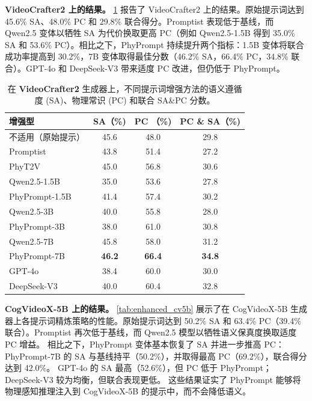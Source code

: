 \textbf{VideoCrafter2 上的结果。}
\cref{tab:enhanced_vc2} 报告了 VideoCrafter2 上的结果。原始提示词达到 45.6\% SA、48.0\% PC 和 29.8\% 联合得分。Promptist 表现低于基线，而 Qwen2.5 变体以牺牲 SA 为代价换取更高 PC（例如 Qwen2.5-1.5B 得到 35.0\% SA 和 53.6\% PC）。相比之下，PhyPrompt 持续提升两个指标：1.5B 变体将联合成功率提高到 30.2\%，7B 变体取得最佳分数（46.2\% SA，66.4\% PC，34.8\% 联合）。GPT-4o 和 DeepSeek-V3 带来适度 PC 改进，但仍低于 PhyPrompt。
\begin{table}[ht]
  \centering
  \caption{在 \textbf{VideoCrafter2} 生成器上，不同提示词增强方法的语义遵循度 (SA)、物理常识 (PC) 和联合 SA\&PC 分数。}
  \setlength{\tabcolsep}{3pt}
  \label{tab:enhanced_vc2}
  \begin{tabular}{lccc}
    \toprule
    \textbf{增强型} & \textbf{SA（\%)} & \textbf{PC （\%)} & \textbf{PC \& SA（\%)} \\
    \midrule
    不适用（原始提示） & 45.6 & 48.0 & 29.8 \\
    Promptist             & 43.8 & 51.4 & 27.2 \\
    PhyT2V                & 45.0 & 56.8 & 30.6 \\
    \midrule
    Qwen2.5-1.5B          & 35.0 & 53.6 & 27.8 \\
    PhyPrompt-1.5B        & 41.4 & 57.4 & 30.2 \\
    Qwen2.5-3B            & 40.0 & 55.8 & 28.0 \\
    PhyPrompt-3B          & 38.0 & 61.0 & 30.8 \\
    Qwen2.5-7B            & 45.8 & 58.0 & 31.2 \\
    PhyPrompt-7B          & \textbf{46.2} & \textbf{66.4} & \textbf{34.8} \\
    \midrule
    GPT-4o                & 38.4 & 60.0 & 30.0 \\
    DeepSeek-V3           & 40.0 & 60.4 & 32.8 \\
    \bottomrule
  \end{tabular}
\end{table}

\textbf{CogVideoX-5B 上的结果。}
\cref{tab:enhanced_cv5b} 展示了在 CogVideoX-5B 生成器上各提示词精炼策略的性能。原始提示词达到 50.2\% SA 和 63.4\% PC（39.4\% 联合）。Promptist 再次低于基线，而 Qwen2.5 模型以牺牲语义保真度换取适度 PC 增益。
相比之下，PhyPrompt 变体基本恢复了 SA 并进一步推高 PC：PhyPrompt-7B 的 SA 与基线持平（50.2\%），并取得最高 PC（69.2\%），联合得分达到 42.0\%。
GPT-4o 的 SA 最高（52.6\%），但 PC 低于 PhyPrompt；DeepSeek-V3 较为均衡，但联合表现更低。
这些结果证实了 PhyPrompt 能够将物理感知推理注入到 CogVideoX-5B 的提示中，而不会降低语义。

